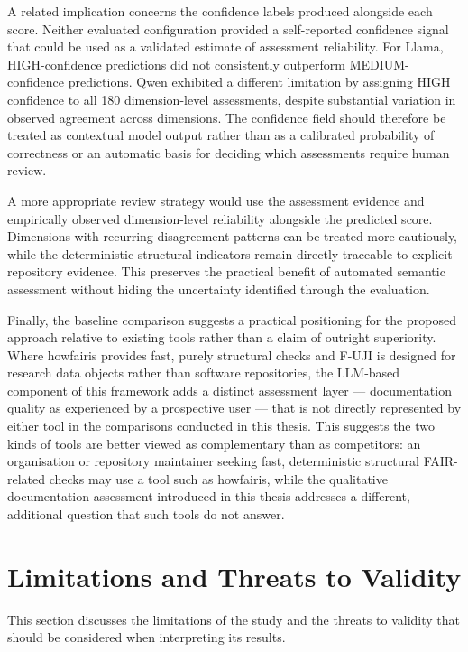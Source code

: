 A related implication concerns the confidence labels produced
alongside each score. Neither evaluated configuration provided a
self-reported confidence signal that could be used as a validated
estimate of assessment reliability. For Llama, HIGH-confidence
predictions did not consistently outperform MEDIUM-confidence
predictions. Qwen exhibited a different limitation by assigning HIGH
confidence to all 180 dimension-level assessments, despite substantial
variation in observed agreement across dimensions. The confidence
field should therefore be treated as contextual model output rather
than as a calibrated probability of correctness or an automatic basis
for deciding which assessments require human review.

A more appropriate review strategy would use the assessment evidence
and empirically observed dimension-level reliability alongside the
predicted score. Dimensions with recurring disagreement patterns can
be treated more cautiously, while the deterministic structural
indicators remain directly traceable to explicit repository evidence.
This preserves the practical benefit of automated semantic assessment
without hiding the uncertainty identified through the evaluation.

Finally, the baseline comparison suggests a practical positioning
for the proposed approach relative to existing tools rather than a
claim of outright superiority. Where howfairis provides fast,
purely structural checks and F-UJI is designed for research data
objects rather than software repositories, the LLM-based component
of this framework adds a distinct assessment
layer --- documentation quality as experienced by a prospective user
--- that is not directly represented by either tool in the
comparisons conducted in this thesis. This suggests the two kinds of
tools are better viewed as complementary than as competitors: an
organisation or repository maintainer seeking fast, deterministic
structural FAIR-related checks may use a tool such as howfairis,
while the qualitative documentation assessment introduced
in this thesis addresses a different, additional question that such
tools do not answer.

\section{Limitations and Threats to Validity}

This section discusses the limitations of the study and the threats
to validity that should be considered when interpreting its results.

